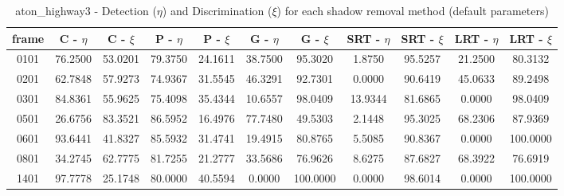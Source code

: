 \begin{appendices}
\begin{table}
\centering
\caption{aton\_highway3 - Detection ($\eta$) and Discrimination ($\xi$) for each shadow removal method (default parameters)}
\begin{tabular}{ |c|c|c|c|c|c|c|c|c|c|c| }
	\hline
\textbf{frame} &  \textbf{C - $\eta$} &  \textbf{C - $\xi$} &  \textbf{P - $\eta$} &  \textbf{P - $\xi$} &  \textbf{G - $\eta$} &  \textbf{G - $\xi$} &  \textbf{SRT - $\eta$} &  \textbf{SRT - $\xi$} &  \textbf{LRT - $\eta$} &  \textbf{LRT - $\xi$} \\
\hline
\hline
0101 &  76.2500 &  53.0201 &   79.3750 &  24.1611 &   38.7500 &  95.3020 &   1.8750 &  95.5257 &   21.2500 &  80.3132    \\
\hline
0201 &  62.7848 &  57.9273 &   74.9367 &  31.5545 &   46.3291 &  92.7301 &   0.0000 &  90.6419 &   45.0633 &  89.2498    \\
\hline
0301 &  84.8361 &  55.9625 &   75.4098 &  35.4344 &   10.6557 &  98.0409 &   13.9344 &  81.6865 &   0.0000 &  98.0409    \\
\hline
0501 &  26.6756 &  83.3521 &   86.5952 &  16.4976 &   77.7480 &  49.5303 &   2.1448 &  95.3025 &   68.2306 &  87.9369    \\
\hline
0601 &  93.6441 &  41.8327 &   85.5932 &  31.4741 &   19.4915 &  80.8765 &   5.5085 &  90.8367 &   0.0000 &  100.0000    \\
\hline
0801 &  34.2745 &  62.7775 &   81.7255 &  21.2777 &   33.5686 &  76.9626 &   8.6275 &  87.6827 &   68.3922 &  76.6919    \\
\hline
1401 &  97.7778 &  25.1748 &   80.0000 &  40.5594 &   0.0000 &  100.0000 &   0.0000 &  98.6014 &   0.0000 &  100.0000    \\

\hline
\end{tabular}

\end{table}


\end{appendices}
